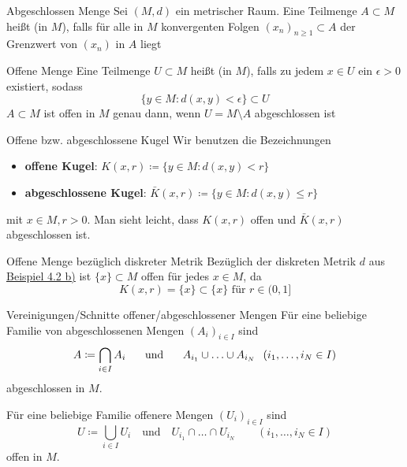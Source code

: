 	\begin{karte}{Abgeschlossen Menge}	
		Sei $(M, d)$ ein metrischer Raum. Eine Teilmenge $A \subset M$ hei{\ss}t  (in $M$), falls für alle in $M$ konvergenten Folgen $(x_{n})_{n \geq 1} \subset A$ der Grenzwert von $(x_{n})$ in $A$ liegt
	\end{karte}

	\begin{karte}{Offene Menge}	
		Eine Teilmenge $U \subset M$ hei{\ss}t  (in $M$), falls zu jedem $x \in U$ ein $\epsilon > 0$ existiert, sodass
			\[ \{ y \in M: d(x, y) < \epsilon \} \subset U \]
			$A \subset M$ ist offen in $M$ genau dann, wenn $U = M \setminus A$ abgeschlossen ist
	\end{karte}
	
	\begin{karte}{Offene bzw. abgeschlossene Kugel}		
		Wir benutzen die Bezeichnungen
			\begin{itemize}
				\item \textbf{offene Kugel}: $K(x, r)  \coloneqq \{ y \in M: d(x, y) < r \}$
				\item \textbf{abgeschlossene Kugel}: $\bar K(x, r) \coloneqq \{ y \in M: d(x, y) \leq r \}$
			\end{itemize}
			mit $x \in M, r > 0$. Man sieht leicht, dass $K(x, r)$ offen und $\bar K(x, r)$ abgeschlossen ist.
	\end{karte}
	
	\begin{karte}{Offene Menge bezüglich diskreter Metrik}
		Bezüglich der diskreten Metrik $d$ aus \hyperref[bsp:1-diskreteMetrik]{Beispiel 4.2 b)} ist $\{x\} \subset M$ offen für jedes $x \in M$, da
			\[ K(x, r) = \{ x \} \subset \{ x \} \text{ für } r \in (0, 1] \]	
	\end{karte}

	\begin{karte}{Vereinigungen/Schnitte offener/abgeschlossener Mengen}
		Für eine beliebige Familie von abgeschlossenen Mengen $(A_{i})_{i \in I}$ sind 
			\[ A \coloneqq \bigcap_{i \in I} A_{i} \hspace{0.5cm} \text{ und } \hspace{0.5cm} A_{i_{1}} \cup \dotsc \cup A_{i_{N}} \hspace{0.25cm} (i_{1}, \dotsc, i_{N} \in I) \]
			abgeschlossen in $M$.
			
		Für eine beliebige Familie offenere Mengen $(U_{i})_{i \in I}$ sind
			\[ U \coloneqq \bigcup_{i \in I} U_{i} \quad \text{und} \quad U_{i_{1}} \cap \dotsc \cap U_{i_{N}} \qquad (i_{1}, \dotsc, i_{N} \in I) \] 
			offen in $M$.
	\end{karte}
	
